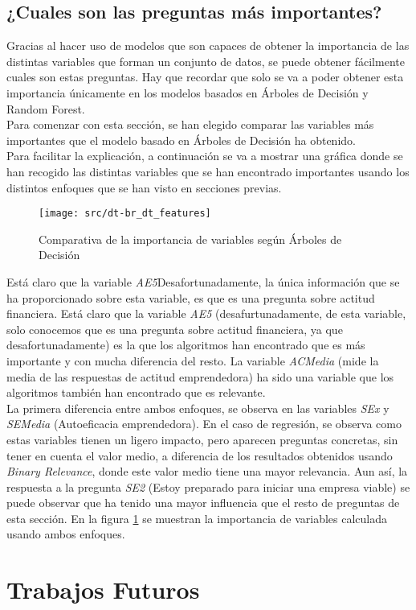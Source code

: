 \section{¿Cuales son las preguntas más importantes?}
Gracias al hacer uso de modelos que son capaces de obtener la importancia de las distintas variables que forman un conjunto de datos, se puede obtener fácilmente cuales son estas preguntas. Hay que recordar que solo se va a poder obtener esta importancia únicamente en los modelos basados en Árboles de Decisión y Random Forest.\\
\linebreak
Para comenzar con esta sección, se han elegido comparar las variables más importantes que el modelo basado en Árboles de Decisión ha obtenido. \\
\linebreak
Para facilitar la explicación, a continuación se va a mostrar una gráfica donde se han recogido las distintas variables que se han encontrado importantes usando los distintos enfoques que se han visto en secciones previas.
\begin{figure}[H]
	\centering
	\texttt{[image: src/dt-br\_dt\_features]}
	\label{fig:dt_ft_cmp1}
	\caption{Comparativa de la importancia de variables según Árboles de Decisión}
\end{figure}
Está claro que la variable \textit{AE5}Desafortunadamente, la única información que se ha proporcionado sobre esta variable, es que es una pregunta sobre actitud financiera. 
Está claro que la variable \textit{AE5} (desafurtunadamente, de esta variable, solo conocemos que es una pregunta sobre actitud financiera, ya que desafortunadamente) es la que los algoritmos han encontrado que es más importante y con mucha diferencia del resto. La variable \textit{ACMedia} (mide la media de las respuestas de actitud emprendedora) ha sido una variable que los algoritmos también han encontrado que es relevante.\\
La primera diferencia entre ambos enfoques, se observa en las variables \textit{SEx} y \textit{SEMedia} (Autoeficacia emprendedora).
En el caso de regresión, se observa como estas variables tienen un ligero impacto, pero aparecen preguntas concretas, sin tener en cuenta el valor medio, a diferencia de los resultados obtenidos usando \textit{Binary Relevance}, donde este valor medio tiene una mayor relevancia. Aun así, la respuesta a la pregunta \textit{SE2} (Estoy preparado para iniciar una empresa viable) se puede observar que ha tenido una mayor influencia que el resto de preguntas de esta sección.
En la figura \ref{fig:dt_ft_cmp1} se muestran la importancia de variables calculada usando ambos enfoques.

\chapter{Trabajos Futuros}